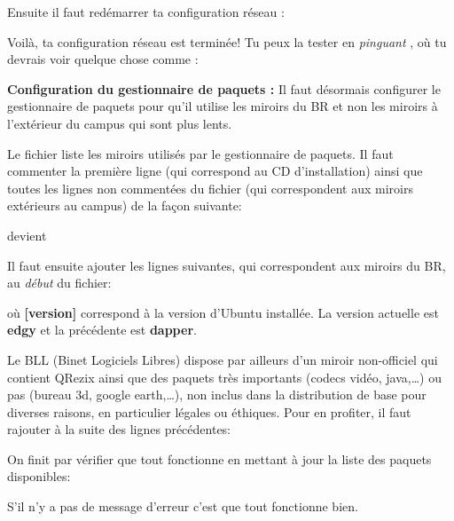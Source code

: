 Ensuite il faut red\'emarrer ta configuration r\'eseau :


Voil\`a, ta configuration r\'eseau est termin\'ee! Tu peux la tester en \emph{pinguant} \fkz, o\`u tu devrais voir quelque chose comme :


\label{ubuntu_mirror} {\bf Configuration du gestionnaire de paquets
:} Il faut d\'esormais configurer le gestionnaire de paquets pour
qu'il utilise les miroirs du BR et non les miroirs \`a l'ext\'erieur du
campus qui sont plus lents.

Le fichier  liste les miroirs utilis\'es par le gestionnaire de paquets. Il faut commenter la premi\`ere ligne (qui
correspond au CD d'installation) ainsi que toutes les lignes non comment\'ees du fichier (qui correspondent aux miroirs ext\'erieurs au campus) de la
fa\c{c}on suivante:


devient


Il faut ensuite ajouter les lignes suivantes, qui correspondent aux miroirs du BR, au \emph{d\'ebut} du fichier:


o\`u \textbf{[version]} correspond \`a la version d'Ubuntu install\'ee. La version actuelle est \textbf{edgy} et la pr\'ec\'edente est \textbf{dapper}.


Le BLL (Binet Logiciels Libres) dispose par ailleurs d'un miroir non-officiel qui contient QRezix ainsi que des paquets tr\`es importants (codecs
vid\'eo, java,\dots) ou pas (bureau 3d, google earth,\dots), non inclus dans la distribution de base pour diverses raisons, en particulier l\'egales ou
\'ethiques. Pour en profiter, il faut rajouter \`a la suite des lignes pr\'ec\'edentes:



On finit par v\'erifier que tout fonctionne en mettant \`a jour la liste
des paquets disponibles:


S'il n'y a pas de message d'erreur c'est que tout fonctionne bien.
